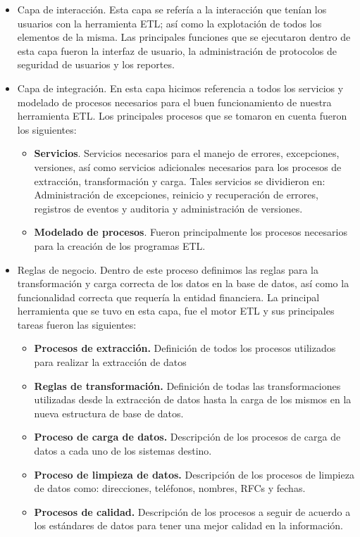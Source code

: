 \begin{itemize}

\item Capa de interacción. Esta capa se refería a la interacción que tenían
  los usuarios con la herramienta ETL; así como la explotación de todos los
  elementos de la misma. Las principales funciones que se ejecutaron dentro de
  esta capa fueron la interfaz de usuario, la administración de protocolos de
  seguridad de usuarios y los reportes.

\item Capa de integración. En esta capa hicimos referencia a todos los
  servicios y modelado de procesos necesarios para el buen funcionamiento de
  nuestra herramienta ETL. Los principales procesos que se tomaron en cuenta
  fueron los siguientes:

  \begin{itemize}
  \item \textbf{Servicios}. Servicios necesarios para el manejo de errores,
    excepciones, versiones, así como servicios adicionales necesarios para los
    procesos de extracción, transformación y carga. Tales servicios se
    dividieron en: Administración de excepciones, reinicio y recuperación de
    errores, registros de eventos y auditoria y administración de versiones.
  \item \textbf{Modelado de procesos}. Fueron principalmente los procesos
    necesarios para la creación de los programas ETL.
  \end{itemize}

\item Reglas de negocio. Dentro de este proceso definimos las reglas para la
  transformación y carga correcta de los datos en la base de datos, así como la
  funcionalidad correcta que requería la entidad financiera. La principal
  herramienta que se tuvo en esta capa, fue el motor ETL y sus principales
  tareas fueron las siguientes:

  \begin{itemize}
  \item \textbf{Procesos de extracción.} Definición de todos los procesos
    utilizados para realizar la extracción de datos
  \item \textbf{Reglas de transformación.} Definición de todas las
    transformaciones utilizadas desde la extracción de datos hasta la carga de
    los mismos en la nueva estructura de base de datos.
  \item \textbf{Proceso de carga de datos.} Descripción de los procesos de carga
    de datos a cada uno de los sistemas destino.
  \item \textbf{Proceso de limpieza de datos.} Descripción de los procesos de
    limpieza de datos como: direcciones, teléfonos, nombres, RFCs y fechas.
  \item \textbf{Procesos de calidad.} Descripción de los procesos a seguir de
    acuerdo a los estándares de datos para tener una mejor calidad en la
    información.
  \end{itemize}

\end{itemize}

